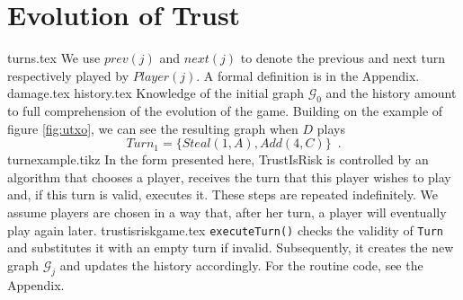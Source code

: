 \section{Evolution of Trust}
  {turns.tex}
  We use $prev\left(j\right)$ and $next\left(j\right)$ to denote the previous and next turn respectively played by
  $Player(j)$. A formal definition is in the Appendix.
  {damage.tex}
  {history.tex}
  Knowledge of the initial graph $\mathcal{G}_0$ and the history amount to full comprehension of the evolution of the
  game. Building on the example of figure \ref{fig:utxo}, we can see the resulting graph when $D$ plays
  \begin{equation}
  \label{turnexample}
     Turn_1 = \{Steal\left(1, A\right), Add\left(4, C\right)\} \enspace.
  \end{equation}
  {turnexample.tikz}
  In the form presented here, TrustIsRisk is controlled by an algorithm that chooses a player, receives the turn that
  this player wishes to play and, if this turn is valid, executes it. These steps are repeated indefinitely. We assume
  players are chosen in a way that, after her turn, a player will eventually play again later.
  {trustisriskgame.tex}
  \texttt{executeTurn()} checks the validity of \texttt{Turn} and substitutes it with an empty turn if invalid.
  Subsequently, it creates the new graph $\mathcal{G}_j$ and updates the history accordingly. For the routine code,
  see the Appendix.
